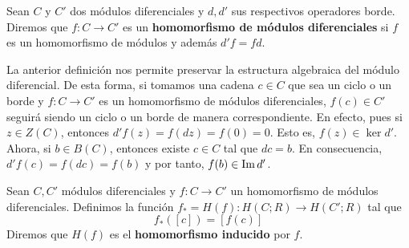 \begin{definicion}
	Sean \(C\) y \(C'\) dos módulos diferenciales y \(d, d'\) sus respectivos operadores
	borde. Diremos que \(f: C \rightarrow C'\) es un \textbf{homomorfismo de módulos
	diferenciales} si \(f\) es un homomorfismo de módulos y además \(d'f = fd\).
\end{definicion}

La anterior definición nos permite preservar la estructura algebraica del módulo
diferencial. De esta forma, si tomamos una cadena \(c \in C\) que sea un ciclo o un
borde y \(f:C \rightarrow C'\) es un homomorfismo de módulos diferenciales,
\(f(c) \in C'\) seguirá siendo un ciclo o un borde de manera correspondiente. En efecto,
pues si \(z \in Z(C)\), entonces \(d'f(z) = f(dz) = f(0) = 0\). Esto es, \(f(z) \in \ker
d'\). Ahora, si \(b \in B(C)\), entonces existe \(c \in C\) tal que \(dc = b\). En consecuencia,
\(d'f(c) = f(dc) = f(b)\) y por tanto, \(f(b) \in \operatorname{Im} d'\).
%
\begin{definicion}
	Sean \(C, C'\) módulos diferenciales y \(f:C \rightarrow C'\) un homomorfismo de módulos
	diferenciales. Definimos la función \(f_{*} = H(f): H(C;R) \rightarrow H(C';R)\)
	tal que
	\[
		f_{*}([c]) = [f(c)]
	\]
	Diremos que \(H(f)\) es el \textbf{homomorfismo inducido} por \(f\).
\end{definicion}

